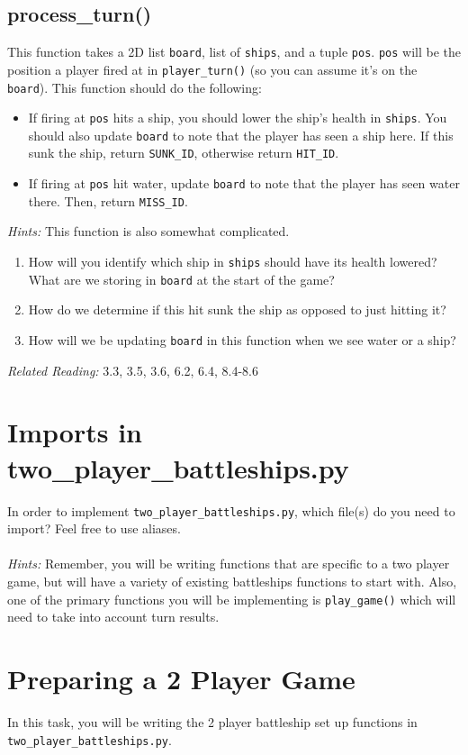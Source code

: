 \documentclass{article}
\begin{document}
\subsection{process\_turn()}
This function takes a 2D list \texttt{board}, list of \texttt{ships}, and a tuple \texttt{pos}. \texttt{pos} will be the position a player fired at in \texttt{player\_turn()} (so you can assume it's on the \texttt{board}). This function should do the following:
\begin{itemize}
    \item If firing at \texttt{pos} hits a ship, you should lower the ship's health in \texttt{ships}. You should also update \texttt{board} to note that the player has seen a ship here. If this sunk the ship, return \texttt{SUNK\_ID}, otherwise return \texttt{HIT\_ID}. 
    \item If firing at \texttt{pos} hit water, update \texttt{board} to note that the player has seen water there. Then, return \texttt{MISS\_ID}.  
\end{itemize}
\textit{Hints:} This function is also somewhat complicated.
\begin{enumerate}
    \item How will you identify which ship in \texttt{ships} should have its health lowered? What are we storing in \texttt{board} at the start of the game?
    \item How do we determine if this hit sunk the ship as opposed to just hitting it?
    \item How will we be updating \texttt{board} in this function when we see water or a ship? 
\end{enumerate}
\textit{Related Reading:} 3.3, 3.5, 3.6, 6.2, 6.4, 8.4-8.6

\section{Imports in two\_player\_battleships.py}
In order to implement \texttt{two\_player\_battleships.py}, which file(s) do you need to import? Feel free to use aliases. \\\\
\textit{Hints:} Remember, you will be writing functions that are specific to a two player game, but will have a variety of existing battleships functions to start with. Also, one of the primary functions you will be implementing is \texttt{play\_game()} which will need to take into account turn results.

\section{Preparing a 2 Player Game}
In this task, you will be writing the 2 player battleship set up functions in \texttt{two\_player\_battleships.py}.
\end{document}
